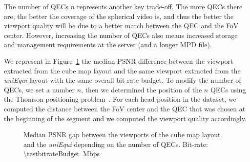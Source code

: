 The number of \acp{QEC} $n$ represents another key trade-off. The more
\acp{QEC} there are, the better the coverage of the spherical video
is, and thus the better the viewport quality will be due to a better
match between the \ac{QEC} and the \ac{FoV} center. However,
increasing the number of \acp{QEC} also means increased storage and
management requirements at the server (and a longer \ac{MPD} file).


We represent in Figure~\ref{fig:QEC} the median \ac{PSNR} difference
between the viewport extracted from the cube map layout and the
same viewport extracted from the \emph{uniEqui} layout with the same
overall bit-rate budget. To modify the number of \acp{QEC}, we set a
number $n$, then we determined the position of the $n$ \acp{QEC} 
using the Thomson positioning problem~\cite{rakhmanov1994electrons}.
For each head position in the dataset, we computed the distance
between the \ac{FoV} center and the \ac{QEC} that was chosen at the
beginning of the segment and we computed the viewport quality
accordingly.
%
%


\begin{figure}
\centering

\caption{Median \acs{PSNR} gap between the viewports of the cube map layout and the \textit{uniEqui} depending
on the number of QECs.
Bit-rate: \SI{\testbitrateBudget}{\mega bps}}
\label{fig:QEC}
\end{figure}

